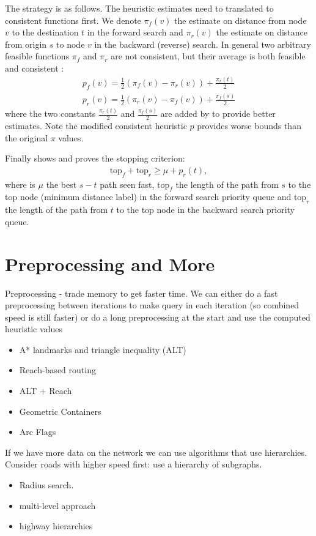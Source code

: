 The strategy is as follows. The heuristic estimates need to translated to consistent functions first. 
We denote $\pi_f(v)$ the estimate on distance from node $v$ to the destination $t$ in the forward search and $\pi_r(v)$ the estimate on distance from origin $s$ to node $v$ in the backward (reverse) search.
In general two arbitrary feasible functions $\pi_f$ and $\pi_r$ are not consistent, but their average is both feasible and consistent \citep{Ikeda}:
\begin{align}
    p_f(v) = \frac{1}{2}(\pi_f(v)-\pi_r(v)) + \frac{\pi_r(t)}{2} \\
    p_r(v) = \frac{1}{2}(\pi_r(v)-\pi_f(v)) + \frac{\pi_f(s)}{2} 
\end{align}
where the two constants $\frac{\pi_r(t)}{2}$ and $\frac{\pi_f(s)}{2}$ are added by \citet{GoldbergEPP} to provide better estimates.
Note the modified consistent heuristic $p$ provides worse bounds than the original $\pi$ values.

Finally \citet{GoldbergEPP} shows and proves the stopping criterion:
\begin{align}
    \text{top}_f + \text{top}_r \geq \mu + p_r(t),
\end{align}
where is $\mu$ the best $s-t$ path seen fast, $\text{top}_f$ the length of the path from $s$ to the top node (minimum distance label) in the forward search priority queue and $\text{top}_r$ the length of the path from $t$ to the top node in the backward search priority queue.

\section{Preprocessing and More}
Preprocessing - trade memory to get faster time.
We can either do a fast preprocessing between iterations to make query in each iteration (so combined speed is still faster) 
or do a long preprocessing at the start and use the computed heuristic values
\begin{itemize}
    \item A* landmarks and triangle inequality (ALT)
    \item Reach-based routing 
    \item ALT + Reach
    \item Geometric Containers
    \item Arc Flags
\end{itemize}

If we have more data on the network we can use
algorithms that use hierarchies.
Consider roads with higher speed first: use a hierarchy of subgraphs.
\begin{itemize}
    \item Radius search.
    \item multi-level approach
    \item highway hierarchies
\end{itemize}

